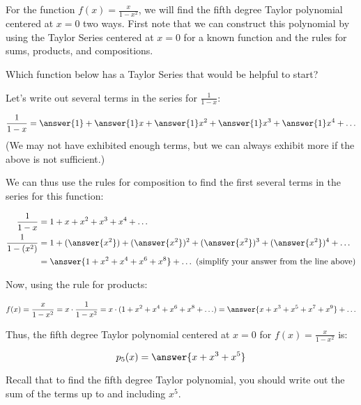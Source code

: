 \documentclass{ximera}
\author{Jim Talamo}
\begin{document}
\begin{exercise}
For the function $f(x) = \frac{x}{1-x^2}$, we will find the fifth degree Taylor polynomial centered at $x=0$ two ways.  First note that we can construct this polynomial by using the Taylor Series centered at $x=0$ for a known function and the rules for sums, products, and compositions.

Which function below has a Taylor Series that would be helpful to start?
\begin{multipleChoice}
\end{multipleChoice}






\begin{exercise}
\begin{exercise}
Let's write out several terms in the series for $\frac{1}{1-x}$:

\[
\frac{1}{1-x} = \answer{1} + \answer{1}x+\answer{1}x^2+\answer{1}x^3+\answer{1}x^4 + \ldots
\]
(We may not have exhibited enough terms, but we can always exhibit more if the above is not sufficient.)

\begin{exercise}
We can thus use the rules for composition to find the first several terms in the series for this function:

\begin{align*}
\frac{1}{1-x} &= 1+x+x^2+x^3 +x^4+ \ldots \\
 \frac{1}{1-(x^2)} &= 1+(\answer{x^2})+(\answer{x^2})^2+(\answer{x^2})^3 +(\answer{x^2})^4 + \ldots \\
&= \answer{1+x^2+x^4+x^6+x^8} + \ldots \textrm{ (simplify your answer from the line above)} \\
\end{align*}

\begin{exercise}
Now, using the rule for products:

\[
f(x) = \frac{x}{1-x^2} = x \cdot \frac{1}{1-x^2} = x \cdot (1+x^2+x^4+x^6+x^8 + \ldots) = \answer{x+x^3+x^5+x^7+x^9} + \ldots
\]

Thus, the fifth degree Taylor polynomial centered at $x=0$ for $f(x) = \frac{x}{1-x^2}$ is:

\[
p_5(x) =  \answer{x+x^3+x^5}
\] 

\begin{hint}
Recall that to find the fifth degree Taylor polynomial, you should write out the sum of the terms up to and including $x^5$.
\end{hint}


\end{exercise}
\end{exercise}
\end{exercise}
\end{exercise}
\end{exercise}
\end{document}
